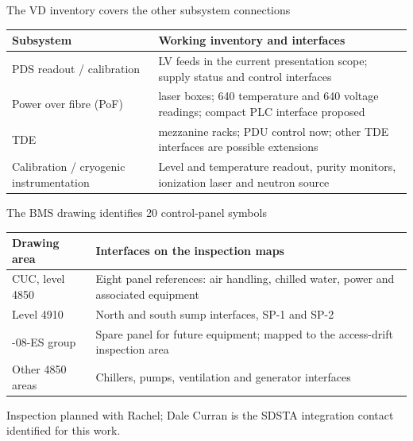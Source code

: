 \begin{frame}{The VD inventory covers the other subsystem connections}
  \renewcommand{\arraystretch}{1.35}
  \begin{tabularx}{\textwidth}{@{}>{\RaggedRight\arraybackslash}p{3.2cm}>{\RaggedRight\arraybackslash}X@{}}
    \toprule
    \textbf{Subsystem} & \textbf{Working inventory and interfaces}\\
    \midrule
    PDS readout / calibration & 34 LV feeds in the current presentation scope; supply status and control interfaces\\
    Power over fibre (PoF) & 80 laser boxes; 640 temperature and 640 voltage readings; compact PLC interface proposed\\
    TDE & 20 mezzanine racks; PDU control now; other TDE interfaces are possible extensions\\
    Calibration / cryogenic instrumentation & Level and temperature readout, purity monitors, ionization laser and neutron source\\
    \bottomrule
  \end{tabularx}
\end{frame}

\begin{frame}{The BMS drawing identifies 20 control-panel symbols}
  \renewcommand{\arraystretch}{1.4}
  \begin{tabularx}{\textwidth}{@{}>{\RaggedRight\arraybackslash}p{3.4cm}>{\RaggedRight\arraybackslash}X@{}}
    \toprule
    \textbf{Drawing area} & \textbf{Interfaces on the inspection maps}\\
    \midrule
    CUC, level 4850 & Eight panel references: air handling, chilled water, power and associated equipment\\
    Level 4910 & North and south sump interfaces, SP-1 and SP-2\\
    4850-08-ES group & Spare panel for future equipment; mapped to the access-drift inspection area\\
    Other 4850 areas & Chillers, pumps, ventilation and generator interfaces\\
    \bottomrule
  \end{tabularx}\par
  \medskip
  Inspection planned with Rachel; Dale Curran is the SDSTA integration contact identified for this work.
\end{frame}

